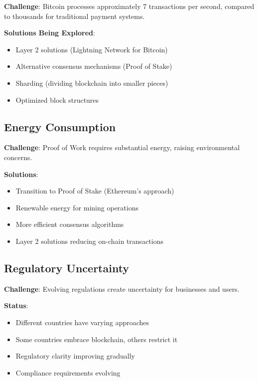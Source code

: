 \textbf{Challenge}: Bitcoin processes approximately 7 transactions per second, compared to thousands for traditional payment systems.

\textbf{Solutions Being Explored}:
\begin{itemize}
  \item Layer 2 solutions (Lightning Network for Bitcoin)
  \item Alternative consensus mechanisms (Proof of Stake)
  \item Sharding (dividing blockchain into smaller pieces)
  \item Optimized block structures
\end{itemize}

\subsection{Energy Consumption}
\label{subsec:energy-consumption}

\textbf{Challenge}: Proof of Work requires substantial energy, raising environmental concerns.

\textbf{Solutions}:
\begin{itemize}
  \item Transition to Proof of Stake (Ethereum's approach)
  \item Renewable energy for mining operations
  \item More efficient consensus algorithms
  \item Layer 2 solutions reducing on-chain transactions
\end{itemize}

\subsection{Regulatory Uncertainty}
\label{subsec:regulatory}

\textbf{Challenge}: Evolving regulations create uncertainty for businesses and users.

\textbf{Status}:
\begin{itemize}
  \item Different countries have varying approaches
  \item Some countries embrace blockchain, others restrict it
  \item Regulatory clarity improving gradually
  \item Compliance requirements evolving
\end{itemize}

